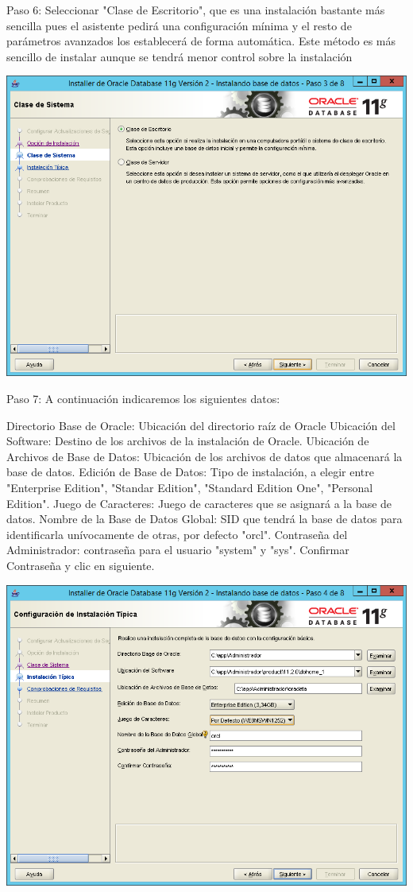 \documentclass[a4paper,openright,12pt]{book}
\begin{document}
Paso 6: Seleccionar "Clase de Escritorio", que es una instalación bastante más sencilla pues el asistente pedirá una configuración mínima y el resto de parámetros avanzados los establecerá de forma automática. Este método es más sencillo de instalar aunque se tendrá menor control sobre la instalación
\begin{center}
\includegraphics[width=15cm]{./windows server/8.png}
\end{center}


Paso 7: A continuación indicaremos los siguientes datos:

Directorio Base de Oracle: Ubicación del directorio raíz de Oracle
Ubicación del Software: Destino de los archivos de la instalación de Oracle.
Ubicación de Archivos de Base de Datos: Ubicación de los archivos de datos que almacenará la base de datos.
Edición de Base de Datos: Tipo de instalación, a elegir entre "Enterprise Edition", "Standar Edition", "Standard Edition One", "Personal Edition". 
Juego de Caracteres: Juego de caracteres que se asignará a la base de datos.
Nombre de la Base de Datos Global: SID que tendrá la base de datos para identificarla unívocamente de otras, por defecto "orcl".
Contraseña del Administrador: contraseña para el usuario "system" y "sys".
Confirmar Contraseña y clic en siguiente.
\begin{center}
\includegraphics[width=15cm]{./windows server/9.png}
\end{center}
\end{document}

